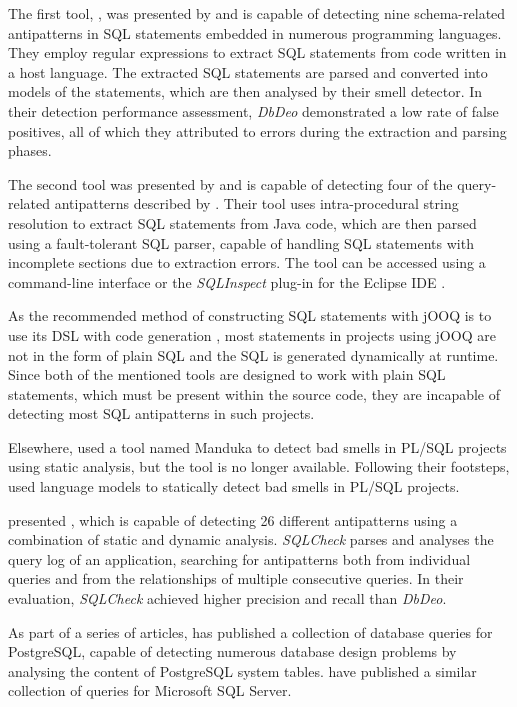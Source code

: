 The first tool, \emph{\citeauthor{dbDeo2026GitHub}} \citeyearpar{dbDeo2026GitHub}, was presented by  and is capable of detecting nine schema-related antipatterns in SQL statements embedded in numerous programming languages. They employ regular expressions to extract SQL statements from code written in a host language. The extracted SQL statements are parsed and converted into models of the statements, which are then analysed by their smell detector. In their detection performance assessment, \emph{DbDeo} demonstrated a low rate of false positives, all of which they attributed to errors during the extraction and parsing phases.

The second tool was presented by  and is capable of detecting four of the query-related antipatterns described by . Their tool uses intra-procedural string resolution to extract SQL statements from Java code, which are then parsed using a fault-tolerant SQL parser, capable of handling SQL statements with incomplete sections due to extraction errors. The tool can be accessed using a command-line interface or the \emph{SQLInspect} plug-in for the Eclipse IDE .

As the recommended method of constructing SQL statements with jOOQ is to use its DSL with code generation , most statements in projects using jOOQ are not in the form of plain SQL and the SQL is generated dynamically at runtime. Since both of the mentioned tools are designed to work with plain SQL statements, which must be present within the source code, they are incapable of detecting most SQL antipatterns in such projects.

Elsewhere,  used a tool named Manduka to detect bad smells in PL/SQL projects using static analysis, but the tool is no longer available. Following their footsteps,  used language models to statically detect bad smells in PL/SQL projects.

 presented \emph{\citeauthor{sqlCheck2026GitHub}} \citeyearpar{sqlCheck2026GitHub}, which is capable of detecting 26 different antipatterns using a combination of static and dynamic analysis. \emph{SQLCheck} parses and analyses the query log of an application, searching for antipatterns both from individual queries and from the relationships of multiple consecutive queries. In their evaluation, \emph{SQLCheck} achieved higher precision and recall than \emph{DbDeo}.

As part of a series of articles,  has published a collection of database queries for PostgreSQL, capable of detecting numerous database design problems by analysing the content of PostgreSQL system tables.  have published a similar collection of queries for Microsoft SQL Server.
